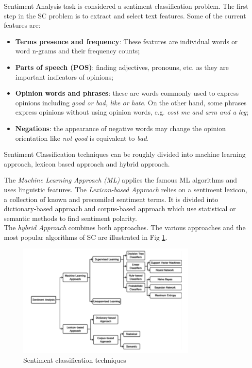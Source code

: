 Sentiment Analysis task is considered a sentiment classification problem. The first step in the SC problem is to extract and select text features. Some of the current features are:
\begin{itemize}
\item \textbf{Terms presence and frequency}: These features are individual words or word n-grams and their frequency counts;
\item \textbf{Parts of speech (POS)}: finding adjectives, pronouns, etc. as they are important indicators of opinions;
\item \textbf{Opinion words and phrases}: these are words commonly used to express opinions including \textit{good or bad, like or hate}. On the other hand, some phrases express opinions without using opinion words, e.g. \textit{cost me and arm and a leg};
\item \textbf{Negations}: the appearance of negative words may change the opinion orientation like \textit{not good} is equivalent to \textit{bad}. 
\end{itemize}

Sentiment Classification techniques can be roughly divided into machine learning approach, lexicon based approach and hybrid approach. \par
The \textit{Machine Learning Approach (ML)} applies the famous ML algorithms and uses linguistic features. The \textit{Lexicon-based Approach} relies on a sentiment lexicon, a collection of known and precomiled sentiment terms. It is divided into dictionary-based approach and corpus-based approach which use statistical or semantic methods to find sentiment polarity.\\
The \textit{hybrid Approach} combines both approaches. The various approaches and the most popular algorithms of SC are illustrated in Fig \ref{fig:sentiment_classification}. 

\begin{figure}[H]
\centering
\includegraphics[width=0.8\textwidth]{./chapters/chapter1/images/sentiment_classification}
\caption{Sentiment classification techniques}
\label{fig:sentiment_classification}
\end{figure}

